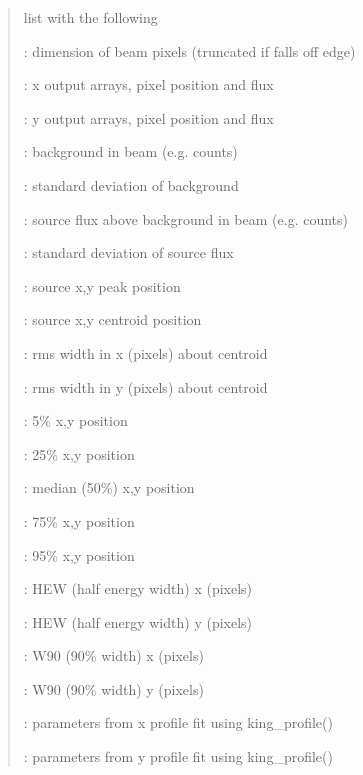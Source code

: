 \documentclass[letterpaper,10pt,english]{sphinxmanual}
\begin{document}
\begin{fulllineitems}
\begin{quote}
\begin{description}
\begin{DUlineblock}{0em}
\item[] list with the following
\item[] :    dimension of beam pixels (truncated if falls off edge)
\item[] :  x output arrays, pixel position and flux
\item[] :  y output arrays, pixel position and flux
\item[] :    background in beam (e.g. counts)
\item[] :   standard deviation of background
\item[] :     source flux above background in beam (e.g. counts)
\item[] :   standard deviation of source flux
\item[] :     source x,y peak position
\item[] :      source x,y centroid position
\item[] :     rms width in x (pixels) about centroid
\item[] :     rms width in y (pixels) about centroid
\item[] :      5\% x,y position
\item[] :     25\% x,y position
\item[] :      median (50\%) x,y position
\item[] :     75\% x,y position
\item[] :     95\% x,y position
\item[] :     HEW (half energy width) x (pixels)
\item[] :     HEW (half energy width) y (pixels)
\item[] :     W90 (90\% width) x (pixels)
\item[] :     W90 (90\% width) y (pixels)
\item[] :     parameters from x profile fit using king\_profile()
\item[] :     parameters from y profile fit using king\_profile()
\end{DUlineblock}



\end{description}
\end{quote}
\end{fulllineitems}
\end{document}
